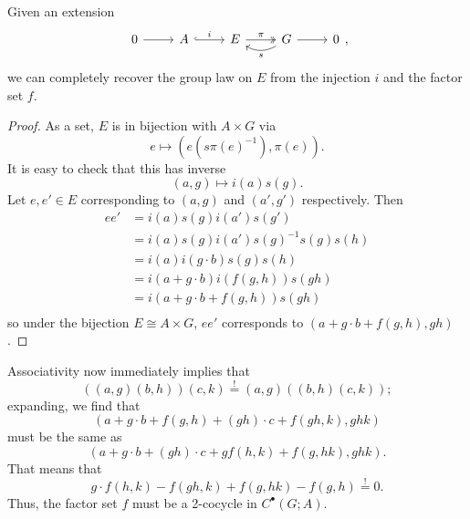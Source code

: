 \documentclass[main.tex]{subfiles}
\begin{document}
\begin{lemma}
  \label{lemma:recover_group_law_on_extension_by_factor_set}
  Given an extension
  \begin{equation*}
    \begin{tikzcd}
      0
      \arrow[r]
      & A
      \arrow[r, hook, "i"]
      & E
      \arrow[r, two heads, "\pi"]
      & G
      \arrow[r]
      \arrow[l, bend left, "s"]
      & 0
    \end{tikzcd},
  \end{equation*}
  we can completely recover the group law on $E$ from the injection $i$ and the factor set $f$.
\end{lemma}
\begin{proof}
  As a set, $E$ is in bijection with $A \times G$ via
  \begin{equation*}
    e \mapsto (e(s\pi(e)^{-1}), \pi(e)).
  \end{equation*}
  It is easy to check that this has inverse
  \begin{equation*}
    (a, g) \mapsto i(a)s(g).
  \end{equation*}
  Let $e, e' \in E$ corresponding to $(a, g)$ and $(a', g')$ respectively. Then
  \begin{align*}
    ee' &= i(a)s(g) i(a')s(g') \\
    &= i(a)s(g)i(a')s(g)^{-1}s(g)s(h) \\
    &= i(a)i(g\cdot b) s(g) s(h) \\
    &= i(a + g\cdot b) i(f(g, h))s(gh) \\
    &= i(a + g\cdot b + f(g, h))s(gh) \\
  \end{align*}
  so under the bijection $E \cong A \times G$, $ee'$ corresponds to $(a + g\cdot b + f(g, h), gh)$.
\end{proof}

Associativity now immediately implies that
\begin{equation*}
  ((a, g)(b, h))(c, k) \overset{!}{=} (a, g)((b, h)(c, k));
\end{equation*}
expanding, we find that
\begin{equation*}
  (a + g\cdot b + f(g, h) + (gh)\cdot c + f(gh, k), ghk)
\end{equation*}
must be the same as
\begin{equation*}
  (a + g\cdot b + (gh)\cdot c + g f(h, k) + f(g, hk), ghk).
\end{equation*}
That means that
\begin{equation*}
  g\cdot f(h, k) - f(gh, k) + f(g, hk) - f(g, h) \overset{!}{=} 0.
\end{equation*}
Thus, the factor set $f$ must be a 2-cocycle in $C^{\bullet}(G; A)$.
\end{document}
